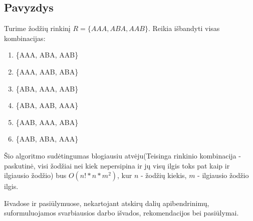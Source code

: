 \documentclass{VUMIFInfKursinis}
\begin{document}
\subsection{Pavyzdys}
Turime žodžių rinkinį $R=\{AAA, ABA, AAB\}$. Reikia išbandyti visas kombinacijas:
\begin{enumerate}
  \item{\{AAA, ABA, AAB\}}
  \item{\{AAA, AAB, ABA\}}
  \item{\{ABA, AAA, AAB\}}
  \item{\{ABA, AAB, AAA\}}
  \item{\{AAB, AAA, ABA\}}
  \item{\{AAB, ABA, AAA\}}
\end{enumerate}

Šio algoritmo sudėtingumas blogiausiu atvėju(Teisinga rinkinio kombinacija - paskutinė, visi žodžiai nei kiek nepersipina ir jų visų ilgis toks pat kaip ir ilgiausio žodžio) bus $O(n! * n * m^2)$, kur $n$ - žodžių kiekis, $m$ - ilgiausio žodžio ilgis.

Išvadose ir pasiūlymuose, nekartojant atskirų dalių apibendrinimų,
suformuluojamos svarbiausios darbo išvados, rekomendacijos bei pasiūlymai.

\printbibliography[heading=bibintoc] %

\end{document}
